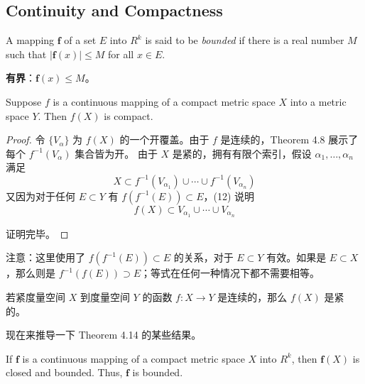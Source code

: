 \documentclass[../poma-notes.tex]{subfiles}
\begin{document}
\subsection*{Continuity and Compactness}

\begin{definition}
  A mapping $\mathbf{f}$ of a set $E$ into $R^k$ is said to be \textit{bounded} if there is a real number
  $M$ such that $|\mathbf{f}(x)| \le M$ for all $x \in E$.
\end{definition}

\begin{anote}
  \textbf{有界}：$\mathbf{f}(x) \le M$。
\end{anote}

\begin{theorem}
  Suppose $f$ is a continuous mapping of a compact metric space $X$ into a metric space $Y$. Then $f(X)$ is
  compact.
\end{theorem}

\begin{proof}
  令 $\{V_\alpha\}$ 为 $f(X)$ 的一个开覆盖。由于 $f$ 是连续的，Theorem 4.8 展示了每个 $f^{-1}(V_\alpha)$ 集合皆为开。
  由于 $X$ 是紧的，拥有有限个索引，假设 $\alpha_1,\dots,\alpha_n$ 满足
  \begin{equation}
    X \subset f^{-1}(V_{\alpha_1}) \cup \cdots \cup f^{-1}(V_{\alpha_n})
  \end{equation}
  又因为对于任何 $E \subset Y$ 有 $f(f^{-1}(E)) \subset E$，(12) 说明
  \begin{equation}
    f(X) \subset V_{\alpha_1} \cup \cdots \cup V_{\alpha_n}
  \end{equation}

  证明完毕。
\end{proof}

注意：这里使用了 $f(f^{-1}(E)) \subset E$ 的关系，对于 $E \subset Y$ 有效。如果是 $E \subset X$，那么则是
$f^{-1}(f(E)) \supset E$；等式在任何一种情况下都不需要相等。

\begin{anote}
  若紧度量空间 $X$ 到度量空间 $Y$ 的函数 $f: X \to Y$ 是连续的，那么 $f(X)$ 是紧的。
\end{anote}

现在来推导一下 Theorem 4.14 的某些结果。

\begin{theorem}
  If $\mathbf{f}$ is a continuous mapping of a compact metric space $X$ into $R^k$, then $\mathbf{f}(X)$
  is closed and bounded. Thus, $\mathbf{f}$ is bounded.
\end{theorem}
\end{document}
